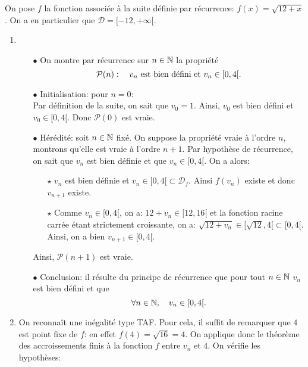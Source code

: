 \documentclass[a4paper, 11pt,reqno]{article}
\begin{document}
\begin{correction}  \;
	On pose $f$ la fonction associ\'ee \`a la suite d\'efinie par r\'ecurrence: $f(x)=\sqrt{12+x}$. On a en particulier que $\mathcal{D}=\lbrack -12,+\infty\lbrack$.
	\begin{enumerate}
		\item
		      \begin{itemize}
			      \item[$\bullet$] On montre par r\'ecurrence sur $n\in\mathbb{N}$ la propri\'et\'e
			            $$\mathcal{P}(n):\quad v_n\ \hbox{est bien d\'efini et}\ v_n\in\lbrack 0,4\lbrack.$$
			      \item[$\bullet$]  Initialisation: pour $n=0$:\\
			            \noindent Par d\'efinition de la suite, on sait que $v_0=1$. Ainsi, $v_0$ est bien d\'efini et $v_0\in\lbrack 0,4\lbrack$. Donc $\mathcal{P}(0)$ est vraie.
			      \item[$\bullet$] H\'er\'edit\'e: soit $n\in\mathbb{N}$ fix\'e. On suppose la propri\'et\'e vraie \`a l'ordre $n$, montrons qu'elle est vraie \`a l'ordre $n+1$. Par hypoth\`ese de r\'ecurrence, on sait que $v_n$ est bien d\'efinie et que $v_n\in\lbrack 0,4\lbrack$. On a alors:
			            \begin{itemize}
				            \item[$\star$] $v_n$ est bien d\'efinie et $v_n\in\lbrack 0,4\lbrack\subset\mathcal{D}_f$. Ainsi $f(v_n)$ existe et donc $v_{n+1}$ existe.
				            \item[$\star$]  Comme $v_n\in\lbrack 0,4\lbrack$, on a: $12+v_n\in\lbrack 12,16\lbrack$ et la fonction racine carr\'ee \'etant strictement croissante, on a: $\sqrt{12+v_n}\in\lbrack \sqrt{12},4\lbrack\subset\lbrack 0,4\lbrack$. Ainsi, on a bien $v_{n+1}\in\lbrack 0,4\lbrack$.
			            \end{itemize}
			            Ainsi, $\mathcal{P}(n+1)$ est vraie.
			      \item[$\bullet$]  Conclusion: il r\'esulte du principe de r\'ecurrence que pour tout $n\in\mathbb{N}$ $v_n$ est bien d\'efini et que
			            $$\forall n\in\mathbb{N},\quad v_n\in\lbrack 0,4\lbrack.$$
		      \end{itemize}
		\item On reconna\^it une in\'egalit\'e type TAF. Pour cela, il suffit de remarquer que $4$ est point fixe de $f$: en effet $f(4)=\sqrt{16}=4$. On applique donc le th\'eor\`eme des accroissements finis \`a la fonction $f$ entre $v_n$ et $4$. On v\'erifie les hypoth\`eses:
		      \begin{itemize}

\end{itemize}
\end{enumerate}
\end{correction}
\end{document}

